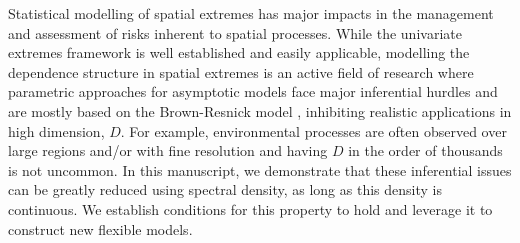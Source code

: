 \documentclass[12pt]{article}
\begin{document}
Statistical modelling of spatial extremes has major impacts in the management and assessment of risks inherent to spatial processes. While the univariate extremes framework is well established and easily applicable, modelling the dependence structure in spatial extremes is an active field of research where parametric approaches for asymptotic models face major inferential hurdles and are mostly based on the Brown-Resnick model \citep{Brown.Resnick:1977, Kabluchko.etal:2009}, inhibiting realistic applications in high dimension, $D$. For example, environmental processes are often observed over large regions and/or with fine resolution and having $D$ in the order of thousands is not uncommon. In this manuscript, we demonstrate that these inferential issues can be greatly reduced using spectral density, as long as this density is continuous. We establish conditions for this property to hold and leverage it to construct new flexible models. 
\end{document}
